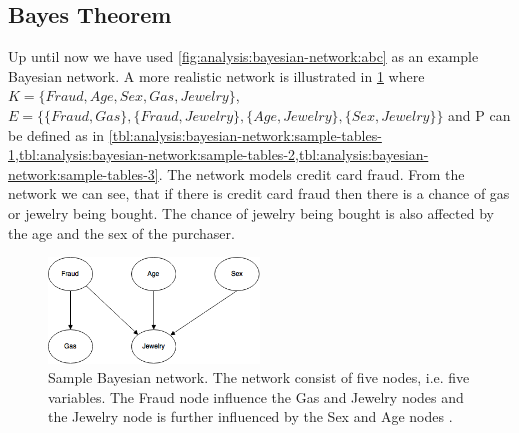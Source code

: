 \subsection{Bayes Theorem}

Up until now we have used \cref{fig:analysis:bayesian-network:abc} as an example Bayesian network. A more realistic network is illustrated in \cref{fig:analysis:bayesian-network:sample} where $K = \{Fraud, Age, Sex, Gas, Jewelry\}$, $E = \{\{Fraud, Gas\}, \{Fraud, Jewelry\}, \{Age, Jewelry\}, \{Sex, Jewelry\}\}$ and P can be defined as in \cref{tbl:analysis:bayesian-network:sample-tables-1,tbl:analysis:bayesian-network:sample-tables-2,tbl:analysis:bayesian-network:sample-tables-3}. The network models credit card fraud. From the network we can see, that if there is credit card fraud then there is a chance of gas or jewelry being bought. The chance of jewelry being bought is also affected by the age and the sex of the purchaser.

\begin{figure}[h!]
\centering
\includegraphics[width=0.5\textwidth]{images/sample_bayesian_network}
\caption{Sample Bayesian network. The network consist of five nodes, i.e. five variables. The Fraud node influence the Gas and Jewelry nodes and the Jewelry node is further influenced by the Sex and Age nodes \cite{stephenson2000introduction}.}
\label{fig:analysis:bayesian-network:sample}
\end{figure}

